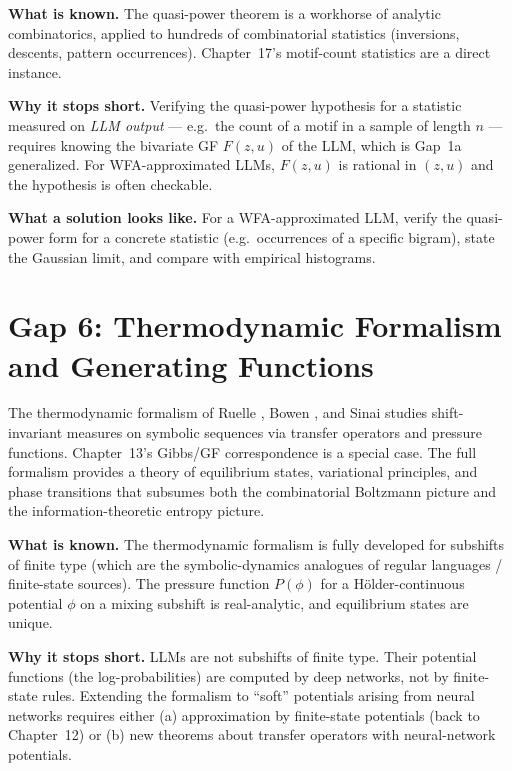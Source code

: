 \textbf{What is known.} The quasi-power theorem is a workhorse of analytic combinatorics, applied to hundreds of combinatorial statistics (inversions, descents, pattern occurrences). Chapter~17's motif-count statistics are a direct instance.

\textbf{Why it stops short.} Verifying the quasi-power hypothesis for a statistic measured on \emph{LLM output} --- e.g.\ the count of a motif in a sample of length $n$ --- requires knowing the bivariate GF $F(z,u)$ of the LLM, which is Gap~1a generalized. For WFA-approximated LLMs, $F(z,u)$ is rational in $(z,u)$ and the hypothesis is often checkable.

\textbf{What a solution looks like.} For a WFA-approximated LLM, verify the quasi-power form for a concrete statistic (e.g.\ occurrences of a specific bigram), state the Gaussian limit, and compare with empirical histograms.

\section{Gap 6: Thermodynamic Formalism and Generating Functions}
\label{ch18:gap6}

The thermodynamic formalism of Ruelle \cite{Ruelle1978}, Bowen \cite{Bowen1975}, and Sinai studies shift-invariant measures on symbolic sequences via transfer operators and pressure functions. Chapter~13's Gibbs/GF correspondence is a special case. The full formalism provides a theory of equilibrium states, variational principles, and phase transitions that subsumes both the combinatorial Boltzmann picture and the information-theoretic entropy picture.

\textbf{What is known.} The thermodynamic formalism is fully developed for subshifts of finite type (which are the symbolic-dynamics analogues of regular languages / finite-state sources). The pressure function $P(\phi)$ for a H\"older-continuous potential $\phi$ on a mixing subshift is real-analytic, and equilibrium states are unique.

\textbf{Why it stops short.} LLMs are not subshifts of finite type. Their potential functions (the log-probabilities) are computed by deep networks, not by finite-state rules. Extending the formalism to ``soft'' potentials arising from neural networks requires either (a) approximation by finite-state potentials (back to Chapter~12) or (b) new theorems about transfer operators with neural-network potentials.


